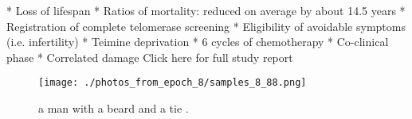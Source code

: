 \documentclass{article}%
\begin{document}
* Loss of lifespan\newline%
* Ratios of mortality: reduced on average by about 14.5 years\newline%
* Registration of complete telomerase screening\newline%
* Eligibility of avoidable symptoms (i.e. infertility)\newline%
* Teimine deprivation\newline%
* 6 cycles of chemotherapy\newline%
* Co{-}clinical phase\newline%
* Correlated damage\newline%
Click here for full study report\newline%

%


\begin{figure}[h!]%
\centering%
\texttt{[image: ./photos\_from\_epoch\_8/samples\_8\_88.png]}%
\caption{a man with a beard and a tie .}%
\end{figure}

%
\end{document}
